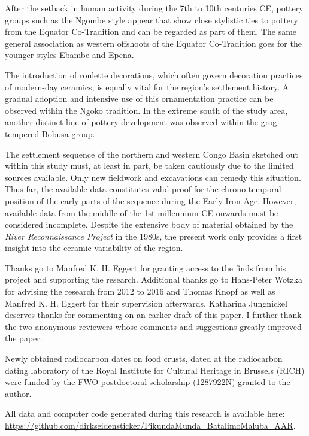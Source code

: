 \documentclass[smallextended,natbib]{svjour3}       %
\begin{document}
After the setback in human activity during the 7th to 10th centuries CE, pottery groups such as the Ngombe style appear that show close stylistic ties to pottery from the Equator Co-Tradition and can be regarded as part of them. The same general association as western offshoots of the Equator Co-Tradition goes for the younger styles Ebambe and Epena.

The introduction of roulette decorations, which often govern decoration practices of modern-day ceramics, is equally vital for the region's settlement history. A gradual adoption and intensive use of this ornamentation practice can be observed within the Ngoko tradition. In the extreme south of the study area, another distinct line of pottery development was observed within the grog-tempered Bobusa group.

The settlement sequence of the northern and western Congo Basin sketched out within this study must, at least in part, be taken cautiously due to the limited sources available. Only new fieldwork and excavations can remedy this situation. Thus far, the available data constitutes valid proof for the chrono-temporal position of the early parts of the sequence during the Early Iron Age. However, available data from the middle of the 1st millennium CE onwards must be considered incomplete. Despite the extensive body of material obtained by the \textit{River Reconnaissance Project} in the 1980s, the present work only provides a first insight into the ceramic variability of the region.

\begin{acknowledgements}
Thanks go to Manfred K. H. Eggert for granting access to the finds from his project and supporting the research. Additional thanks go to Hans-Peter Wotzka for advising the research from 2012 to 2016 and Thomas Knopf as well as Manfred K. H. Eggert for their supervision afterwards. Katharina Jungnickel deserves thanks for commenting on an earlier draft of this paper. I further thank the two anonymous reviewers whose comments and suggestions greatly improved the paper.

Newly obtained radiocarbon dates on food crusts, dated at the radiocarbon dating laboratory of the Royal Institute for Cultural Heritage in Brussels (RICH) were funded by the FWO postdoctoral scholarship (1287922N) granted to the author.

All data and computer code generated during this research is available here: \url{https://github.com/dirkseidensticker/PikundaMunda_BatalimoMaluba_AAR}.
\end{acknowledgements}



\end{document}
